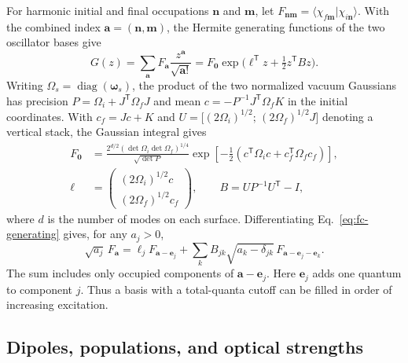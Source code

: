For harmonic initial and final occupations $\mathbf n$ and $\mathbf m$, let
$F_{\mathbf n\mathbf m}=\langle\chi_{f\mathbf m}|\chi_{i\mathbf n}\rangle$.
With the combined index $\mathbf a=(\mathbf n,\mathbf m)$, the Hermite
generating functions of the two oscillator bases give
\begin{equation}
 G(z)=\sum_{\mathbf a}F_{\mathbf a}\frac{z^{\mathbf a}}{\sqrt{\mathbf a!}}
   =F_{\mathbf 0}\exp\bigl(\ell^{\mathsf T}z+\tfrac12 z^{\mathsf T}Bz\bigr).
 \label{eq:fc-generating}
\end{equation}
Writing $\Omega_s=\operatorname{diag}(\boldsymbol\omega_s)$, the product of
the two normalized vacuum Gaussians has precision
$P=\Omega_i+J^{\mathsf T}\Omega_f J$ and mean
$c=-P^{-1}J^{\mathsf T}\Omega_f K$ in the initial coordinates.
With $c_f=Jc+K$ and
$U=\bigl[(2\Omega_i)^{1/2};\,(2\Omega_f)^{1/2}J\bigr]$ denoting a vertical
stack, the Gaussian integral gives
\begin{equation}
 \begin{aligned}
 F_{\mathbf 0}&=
 \frac{2^{d/2}(\det\Omega_i\det\Omega_f)^{1/4}}{\sqrt{\det P}}
 \exp\!\left[-\tfrac12(c^{\mathsf T}\Omega_i c+c_f^{\mathsf T}\Omega_f c_f)\right],\\
 \ell&=\begin{pmatrix}(2\Omega_i)^{1/2}c\\(2\Omega_f)^{1/2}c_f\end{pmatrix},
 \qquad B=UP^{-1}U^{\mathsf T}-I ,
 \end{aligned}
\end{equation}
where $d$ is the number of modes on each surface. Differentiating
Eq.~\eqref{eq:fc-generating} gives, for any $a_j>0$,
\begin{equation}
 \sqrt{a_j}\,F_{\mathbf a}=
 \ell_j F_{\mathbf a-\mathbf e_j}
 +\sum_k B_{jk}\sqrt{a_k-\delta_{jk}}\,
 F_{\mathbf a-\mathbf e_j-\mathbf e_k} .
 \label{eq:fc-recurrence}
\end{equation}
The sum includes only occupied components of $\mathbf a-\mathbf e_j$.
Here $\mathbf e_j$ adds one quantum to component $j$. Thus a basis with a
total-quanta cutoff can be filled in order of increasing excitation.

\subsection{Dipoles, populations, and optical strengths}

